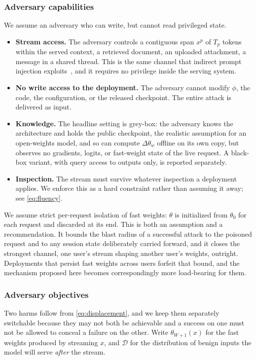 \documentclass[journal]{IEEEtran}
\newcommand{\slow}{\phi}
\newcommand{\fast}{\theta}
\newcommand{\anchorp}{\theta_{0}}
\newcommand{\dtheta}{\Delta\theta}
\begin{document}
\subsubsection{Adversary capabilities}
We assume an adversary who can write, but cannot read privileged state.

\begin{itemize}
\item[\textbf{A1}] \textbf{Stream access.} The adversary controls a contiguous span
$x^{p}$ of $T_p$ tokens within the served context, a retrieved document, an
uploaded attachment, a message in a shared thread. This is the same channel that
indirect prompt injection exploits~\cite{greshake2023injection}, and it requires no
privilege inside the serving system.

\item[\textbf{A2}] \textbf{No write access to the deployment.} The adversary cannot
modify $\slow$, the code, the configuration, or the released checkpoint. The entire
attack is delivered as input.

\item[\textbf{A3}] \textbf{Knowledge.} The headline setting is grey-box: the
adversary knows the architecture and holds the public checkpoint, the realistic
assumption for an open-weights model, and so can compute $\dtheta_w$ offline on
its own copy, but observes no gradients, logits, or fast-weight state of the live
request. A black-box variant, with query access to outputs only, is reported
separately.

\item[\textbf{A4}] \textbf{Inspection.} The stream must survive whatever inspection
a deployment applies. We enforce this as a hard constraint rather than assuming it
away; see \eqref{eq:fluency}.
\end{itemize}

We assume strict per-request isolation of fast weights: $\fast$ is initialized from
$\anchorp$ for each request and discarded at its end. This is both an assumption and
a recommendation. It bounds the blast radius of a successful attack to the poisoned
request and to any session state deliberately carried forward, and it closes the
strongest channel, one user's stream shaping another user's weights, outright.
Deployments that persist fast weights across users forfeit that bound, and the
mechanism proposed here becomes correspondingly more load-bearing for them.

\subsubsection{Adversary objectives}
Two harms follow from \eqref{eq:displacement}, and we keep them separately
switchable because they may not both be achievable and a success on one must not be
allowed to conceal a failure on the other. Write $\fast_{W+1}(x)$ for the fast
weights produced by streaming $x$, and $\mathcal{D}$ for the distribution of benign
inputs the model will serve \emph{after} the stream.
\end{document}
